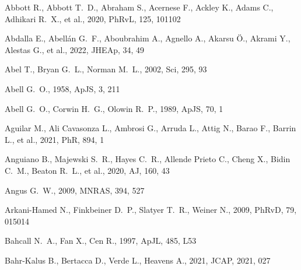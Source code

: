 \documentclass[fleqn,usenatbib]{mnras}
\begin{document}
\begin{thebibliography}{}

 Abbott R., Abbott T.~D., Abraham S., Acernese F., Ackley K., Adams C., Adhikari R.~X., et al., 2020, PhRvL, 125, 101102


 Abdalla E., Abell{\'a}n G.~F., Aboubrahim A., Agnello A., Akarsu {\"O}., Akrami Y., Alestas G., et al., 2022, JHEAp, 34, 49

 Abel T., Bryan G.~L., Norman M.~L., 2002, Sci, 295, 93

 Abell G.~O., 1958, ApJS, 3, 211

 Abell G.~O., Corwin H.~G., Olowin R.~P., 1989, ApJS, 70, 1

 Aguilar M., Ali Cavasonza L., Ambrosi G., Arruda L., Attig N., Barao F., Barrin L., et al., 2021, PhR, 894, 1

 Anguiano B., Majewski S.~R., Hayes C.~R., Allende Prieto C., Cheng X., Bidin C.~M., Beaton R.~L., et al., 2020, AJ, 160, 43

 Angus G.~W., 2009, MNRAS, 394, 527

 Arkani-Hamed N., Finkbeiner D.~P., Slatyer T.~R., Weiner N., 2009, PhRvD, 79, 015014


 Bahcall N.~A., Fan X., Cen R., 1997, ApJL, 485, L53

 Bahr-Kalus B., Bertacca D., Verde L., Heavens A., 2021, JCAP, 2021, 027 


\end{thebibliography}
\end{document}
